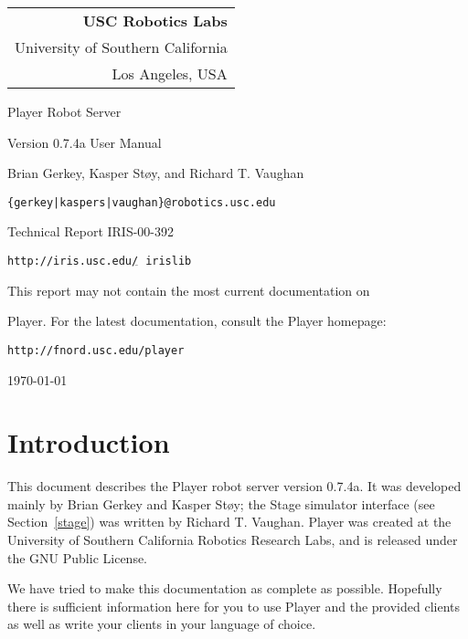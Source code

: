 \documentclass[11pt]{article}
\begin{document}
\titlepage

\begin{flushright}
\begin{tabular}{r}
{\bf USC Robotics Labs}\\
University of Southern California\\
Los Angeles, USA\\
\end{tabular}
\end{flushright}

\vspace{6cm}
\centerline{\huge{Player Robot Server}}
\vspace{0.5cm}
\centerline{\large{Version 0.7.4a User Manual}}
\vspace{2cm}

\centerline{\large Brian Gerkey, Kasper St\o{}y, and Richard T. Vaughan}
\vspace{0.5cm}
\centerline{{\tt \{gerkey|kaspers|vaughan\}@robotics.usc.edu}}
\vspace{1cm}
\centerline{Technical Report IRIS-00-392}
\centerline{{\tt http://iris.usc.edu/${}_{\tilde{}}$\,irislib}}
\vspace{1cm}
\centerline{This report may not contain the most current documentation on}
\centerline{Player.  For the latest documentation, consult the Player homepage:}
\centerline{{\tt http://fnord.usc.edu/player}}

\vspace{4cm}

\centerline{\today}

\newpage

\tableofcontents

\newpage

\section{Introduction}
\label{intro}
This document describes the Player robot server version 0.7.4a.  It was
developed mainly by Brian Gerkey and Kasper St\o{}y; the Stage simulator
interface (see Section~\ref{stage}) was written by Richard T. Vaughan.
Player was created at the University of Southern
California Robotics Research Labs, and is released under the GNU Public
License.

We have tried to make this documentation as complete as possible.
Hopefully there is sufficient information here for you to use Player
and the provided clients as well as write your clients in your
language of choice. 
\end{document}
